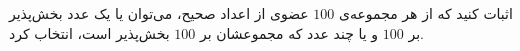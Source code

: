 \p
اثبات کنید که از هر مجموعه‌ی 
$100$
عضوی از اعداد صحیح، می‌توان یا یک عدد بخش‌پذیر بر
$100$
و یا چند عدد که مجموعشان بر
$100$
بخش‌پذیر است، انتخاب کرد.
